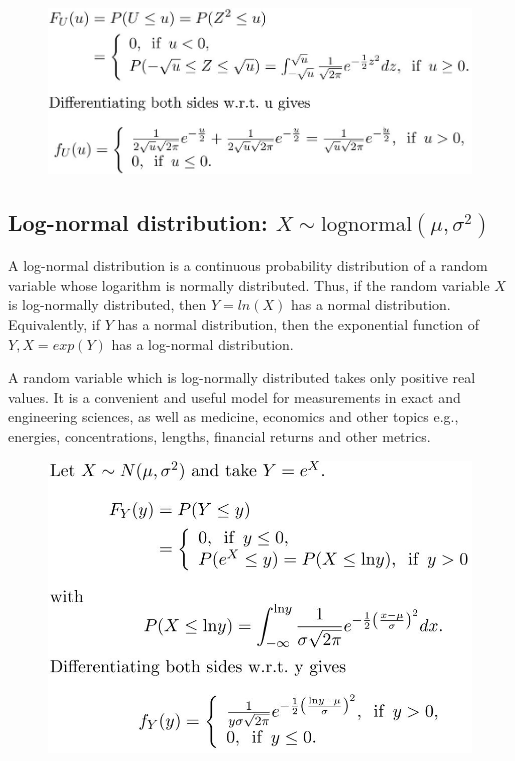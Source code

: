 \documentclass[10pt,a4paper]{article}
\begin{document}
\begin{figure} [h!]
    \centering
    \includegraphics[scale=0.5]{Chi.JPG}
\end{figure}

\subsection{Log-normal distribution: $X \sim \text{lognormal}(\mu, \sigma^2)$}

A log-normal distribution is a continuous probability distribution of a random variable whose
logarithm is normally distributed. Thus, if the random variable $X$ is log-normally distributed,
then $Y = ln(X)$ has a normal distribution. Equivalently, if $Y$ has a normal distribution, then the
exponential function of $Y, X = exp(Y)$ has a log-normal distribution. 

A random variable which is log-normally distributed takes only positive real values. It is a
convenient and useful model for measurements in exact and engineering sciences, as well as medicine,
economics and other topics e.g., energies, concentrations, lengths, financial returns and other metrics. 

\begin{figure} [h!]
    \centering
    \includegraphics[scale=0.5]{Log.JPG}
\end{figure}
\end{document}

